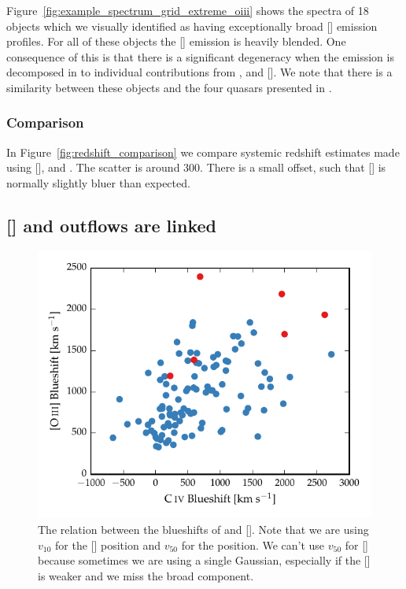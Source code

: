 Figure~\ref{fig:example_spectrum_grid_extreme_oiii} shows the spectra of 18 objects which we visually identified as having exceptionally broad [] emission profiles. 
For all of these objects the [] emission is heavily blended. 
One consequence of this is that there is a significant degeneracy when the emission is decomposed in to individual contributions from , \hb and []. 
We note that there is a similarity between these objects and the four quasars presented in \citet{zakamska16}. 

\subsubsection{Comparison}

In Figure~\ref{fig:redshift_comparison} we compare systemic redshift estimates made using [], \hb and \ha. 
The scatter is around 300\kms. 
There is a small offset, such that [] is normally slightly bluer than expected. 

\subsection{[] and  outflows are linked}


\begin{figure}
    \includegraphics[width=\columnwidth]{figures/chapter04/civ_blueshift_oiii_blueshift.pdf} 
    \caption{The relation between the blueshifts of  and []. Note that we are using $v_{10}$ for the [] position and $v_{50}$ for the  position. We can't use $v_{50}$ for [] because sometimes we are using a single Gaussian, especially if the [] is weaker and we miss the broad component.}     
    \label{fig:oiii_civ_blueshifts}
\end{figure}

